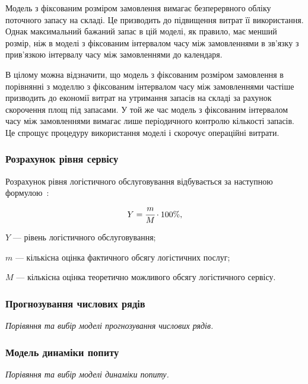 Модель з фіксованим розміром замовлення вимагає безперервного обліку поточного запасу на складі.
Це призводить до підвищення витрат її використання.
Однак максимальний бажаний запас в цій моделі, як правило, має менший розмір, ніж в моделі з фіксованим інтервалом часу між замовленнями в зв'язку з прив'язкою інтервалу часу між замовленнями до календаря.

В цілому можна відзначити, що модель з фіксованим розміром замовлення в порівнянні з моделлю з фіксованим інтервалом часу між замовленнями частіше призводить до економії витрат на утримання запасів на складі за рахунок скорочення площ під запасами.
У той же час модель з фіксованим інтервалом часу між замовленнями вимагає лише періодичного контролю кількості запасів.
Це спрощує процедуру використання моделі і скорочує операційні витрати.

\subsubsection{Розрахунок рівня сервісу}
Розрахунок рівня логістичного обслуговування відбувається за наступною формулою~\cite{Sterligova2008}:
\begin{equation}
Y=\cfrac{m}{M} \cdot 100\%
,
\end{equation}
\begin{description}
	\item[де] $Y$ --- рівень логістичного обслуговування;
	\item $m$ --- кількісна оцінка фактичного обсягу логістичних послуг;
	\item $M$ --- кількісна оцінка теоретично можливого обсягу логістичного сервісу.
\end{description}

\subsubsection{Прогнозування числових рядів}
\textit{Порівяння та вибір моделі прогнозування числових рядів.}

\subsubsection{Модель динаміки попиту}
\textit{Порівяння та вибір моделі динаміки попиту.}




